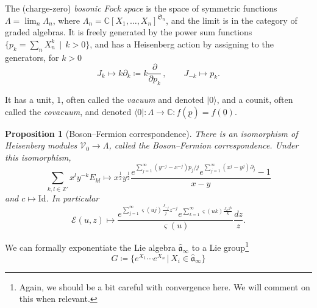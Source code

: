 \documentclass[10pt,a4paper,oneside,no-math,reqno]{amsart}%
\theoremstyle{plain}
\newtheorem{proposition}[theorem]{Proposition}
\theoremstyle{definition}
\theoremstyle{remark}
\numberwithin{equation}{section}
\newcommand{\normord}[1]{\mathord{\vcentcolon\mathrel{#1}\vcentcolon}}
\newcommand{\mb}[1]{\mathbb{#1}}
\newcommand{\mf}[1]{\mathfrak{#1}}
\newcommand{\mc}[1]{\mathcal{#1}}
\newcommand{\1}{\mathds{1}}
\newcommand{\C}{\mb{C}}
\newcommand{\Z}{\mb{Z}}
\newcommand{\<}{\langle}
\renewcommand{\>}{\rangle}
\newcommand{\del}{\partial}
\newcommand{\Id}{\mathord{\mathrm{Id}}}
\begin{document}

The (charge-zero) \emph{bosonic Fock space} is the space of symmetric functions $ \Lambda = \lim_n \Lambda_n$, where  $ \Lambda_n = \C [ X_1, \dotsc, X_n]^{\mf{S}_n}$, and the limit is in the category of graded algebras. It is freely generated by the power sum functions $ \{ p_k = \sum_n X_n^k \, \mid \, k > 0\} $, and has a Heisenberg action by assigning to the generators, for $ k > 0$
\begin{equation}
    J_k \mapsto k \del_k \coloneqq k \frac{\del}{\del p_k} \,,
    \qquad
    J_{-k} \mapsto p_k .
\end{equation}

It has a unit, $ 1$, often called the \emph{vacuum} and denoted $ |0 \>$, and a counit, often called the \emph{covacuum}, and denoted $ \< 0| \colon \Lambda \to \C \colon f(\underline{p}) = f(\underline{0})$.

\begin{proposition}[Boson--Fermion correspondence]
    There is an isomorphism of Heisenberg modules $ \mc{V}_0 \to \Lambda$, called the Boson--Fermion correspondence. Under this isomorphism,
    \begin{equation}
        \sum_{k,l \in\Z'} x^l y^{-k} E_{kl}
        \mapsto
        x^{\frac{1}{2}}y^{\frac{1}{2}}\frac{e^{\sum_{j=1}^\infty (y^{-j} - x^{-j})p_j/j } e^{\sum_{j=1}^\infty (x^j - y^j)\del_j} -1}{x-y} 
    \end{equation}
    and $ c \mapsto \Id $. In particular
    \begin{equation}
        \mc{E}(u,z) \mapsto \frac{e^{\sum_{j=1}^\infty \varsigma (uj) \frac{J_{-j}}{j} z^{-j}} e^{ \sum_{k=1}^\infty \varsigma (uk) \frac{J_k z^k }{k}} }{\varsigma (u)} \frac{dz}{z}.
    \end{equation}
\end{proposition}

We can formally exponentiate the Lie algebra $ \widehat{\mf{a}}_\infty$ to a Lie group\footnote{Again, we should be a bit careful with convergence here. We will comment on this when relevant.}
\begin{equation}
    G
    \coloneqq
    \big\{ e^{X_1} \dotsb e^{X_n} \, \big| \, X_i \in \widehat{\mf{a}}_\infty \big\}
\end{equation}
\end{document}
